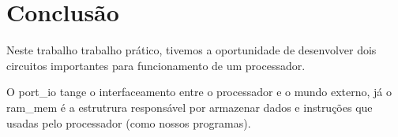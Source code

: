 \documentclass{article}
\begin{document}
\section{Conclusão}

Neste trabalho trabalho prático, tivemos a oportunidade de desenvolver dois circuitos importantes para funcionamento de um processador.

O port\_io tange o interfaceamento entre o processador e o mundo externo, já o ram\_mem é a estrutrura responsável por armazenar dados e instruções que usadas pelo processador (como nossos programas).
\end{document}

